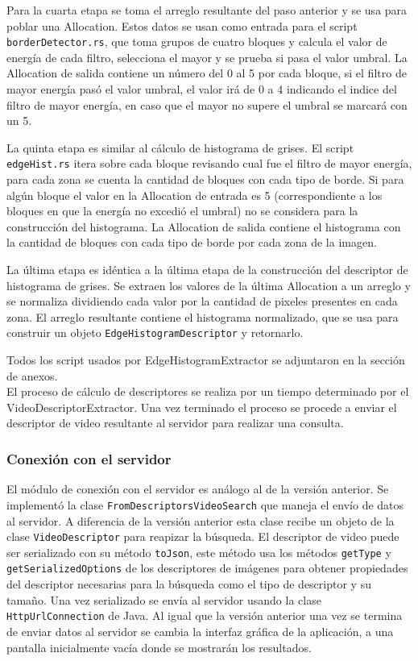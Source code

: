 Para la cuarta etapa se toma el arreglo resultante del paso anterior y se usa para poblar una Allocation. Estos datos se usan como entrada para el script \texttt{borderDetector.rs}, que toma grupos de cuatro bloques y calcula el valor de energía de cada filtro, selecciona el mayor y se prueba si pasa el valor umbral. La Allocation de salida contiene un número del 0 al 5 por cada bloque, si el filtro de mayor energía pasó el valor umbral, el valor irá de 0 a 4 indicando el indice del filtro de mayor energía, en caso que el mayor no supere el umbral se marcará con un 5.

La quinta etapa es similar al cálculo de histograma de grises. El script \texttt{edgeHist.rs} itera sobre cada bloque revisando cual fue el filtro de mayor energía, para cada zona se cuenta la cantidad de bloques con cada tipo de borde. Si para algún bloque el valor en la Allocation de entrada es 5 (correspondiente a los bloques en que la energía no excedió el umbral) no se considera para la construcción del histograma. La Allocation de salida contiene el histograma con la cantidad de bloques con cada tipo de borde por cada zona de la imagen.

La última etapa es idéntica a la última etapa de la construcción del descriptor de histograma de grises. Se extraen los valores de la última Allocation a un arreglo y se normaliza dividiendo cada valor por la cantidad de pixeles presentes en cada zona. El arreglo resultante contiene el histograma normalizado, que se usa para construir un objeto \texttt{EdgeHistogramDescriptor} y retornarlo.

Todos los script usados por EdgeHistogramExtractor se adjuntaron en la sección de anexos.\\

El proceso de cálculo de descriptores se realiza por un tiempo determinado por el VideoDescriptorExtractor. Una vez terminado el proceso se procede a enviar el descriptor de video resultante al servidor para realizar una consulta.

\subsubsection*{Conexión con el servidor}
 El módulo de conexión con el servidor es análogo al de la versión anterior. Se implementó la clase \texttt{FromDescriptorsVideoSearch} que maneja el envío de datos al servidor. A diferencia de la versión anterior esta clase recibe un objeto de la clase \texttt{VideoDescriptor} para reapizar la búsqueda. El descriptor de video puede ser serializado con su método \texttt{toJson}, este método usa los métodos \texttt{getType} y \texttt{getSerializedOptions} de los descriptores de imágenes para obtener propiedades del descriptor necesarias para la búsqueda como el tipo de descriptor y su tamaño. Una vez serializado se envía al servidor usando la clase \texttt{HttpUrlConnection} de Java. Al igual que la versión anterior una vez se termina de enviar datos al servidor se cambia la interfaz gráfica de la aplicación, a una pantalla inicialmente vacía donde se mostrarán los resultados.

